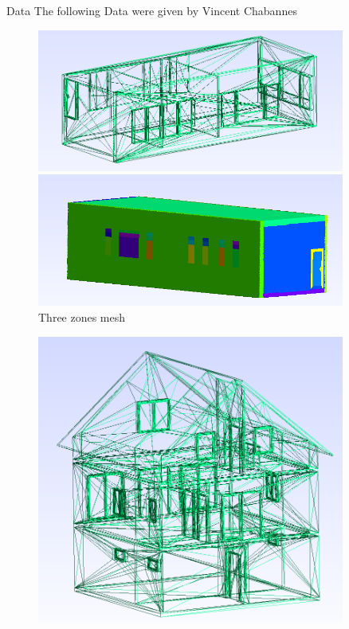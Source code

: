 \documentclass[10pt]{beamer}
\begin{document}
\begin{frame}{Data}
    The following Data were given by Vincent Chabannes
    \begin{figure}
        \begin{minipage}{0.33\textwidth}
            \centering
            \includegraphics[width=0.9\textwidth]{../image/3zones_stl.png}
        \end{minipage}%
        \begin{minipage}{0.33\textwidth}
            \centering
            \includegraphics[width=0.9\textwidth]{../image/label_three_zone.png}
        \end{minipage}%
        \caption{Three zones mesh}
    \end{figure}
    \begin{figure}
        \begin{minipage}{0.33\textwidth}
            \centering
            \includegraphics[width=0.9\textwidth]{../image/jasmin_stl.png}

\end{minipage}
\end{figure}
\end{frame}
\end{document}
